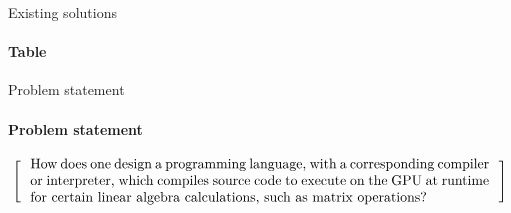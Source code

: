 
\begin{frame}{Existing solutions}
\framesubtitle{Table }
  
\end{frame}

\begin{frame}{Problem statement}
\framesubtitle{Problem statement}
\[
  \left[
  \begin{minipage}{\textwidth}
  \centering
  \begin{minipage}{0.96\textwidth}
  How does one design a programming language, with a corresponding compiler or interpreter, which compiles source code to execute on the GPU at runtime for certain linear algebra calculations, such as matrix operations?
  \end{minipage}
  \end{minipage}
    \right]
\]
\end{frame}
